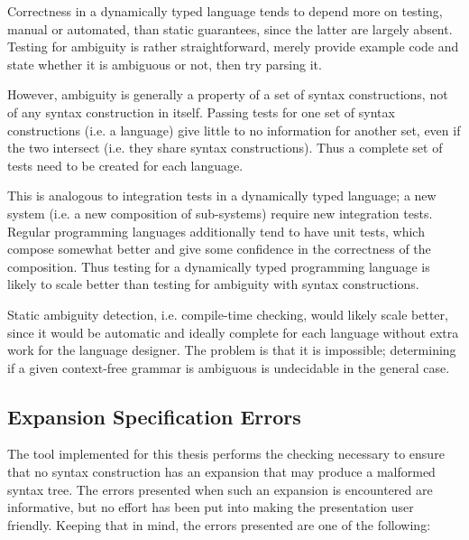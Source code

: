 \documentclass{kththesis}
\begin{document}
Correctness in a dynamically typed language tends to depend more on testing, manual or automated, than static guarantees, since the latter are largely absent. Testing for ambiguity is rather straightforward, merely provide example code and state whether it is ambiguous or not, then try parsing it.

However, ambiguity is generally a property of a set of syntax constructions, not of any syntax construction in itself. Passing tests for one set of syntax constructions (i.e. a language) give little to no information for another set, even if the two intersect (i.e. they share syntax constructions). Thus a complete set of tests need to be created for each language.

This is analogous to integration tests in a dynamically typed language; a new system (i.e. a new composition of sub-systems) require new integration tests. Regular programming languages additionally tend to have unit tests, which compose somewhat better and give some confidence in the correctness of the composition. Thus testing for a dynamically typed programming language is likely to scale better than testing for ambiguity with syntax constructions.

Static ambiguity detection, i.e. compile-time checking, would likely scale better, since it would be automatic and ideally complete for each language without extra work for the language designer. The problem is that it is impossible; determining if a given context-free grammar is ambiguous is undecidable in the general case.


\subsection{Expansion Specification Errors}

The tool implemented for this thesis performs the checking necessary to ensure that no syntax construction has an expansion that may produce a malformed syntax tree. The errors presented when such an expansion is encountered are informative, but no effort has been put into making the presentation user friendly. Keeping that in mind, the errors presented are one of the following:
\end{document}
